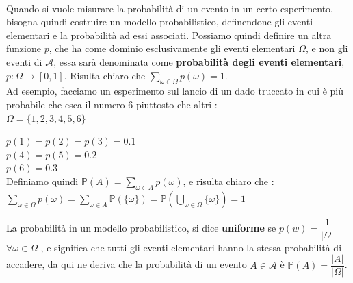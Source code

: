 \documentclass[12pt, letterpaper]{article}
\begin{document}
\\ Quando si vuole misurare la probabilità di un evento in un certo 
esperimento, bisogna quindi costruire un modello probabilistico, definendone gli eventi elementari e
 la probabilità ad essi associati. Possiamo quindi definire un altra funzione \(p\), che ha come dominio
 esclusivamente gli eventi elementari \(\Omega\), e non gli eventi di \(\mathcal{A}\), essa sarà 
 denominata come \textbf{probabilità degli eventi elementari}, \(p:\Omega \rightarrow [0,1]\). Risulta
 chiaro che \(\displaystyle\sum_{\omega \in \Omega} p(\omega)=1  \).\\
 Ad esempio, facciamo un esperimento sul lancio di un dado truccato in cui è più probabile che esca 
 il numero 6 piuttosto che altri :
 \\ \center \(\Omega=\{1,2,3,4,5,6\}\)\\
 \raggedright\( p(1)=p(2)=p(3)=0.1\)\\\( p(4)=p(5)=0.2\)\\\(p(6)=0.3\)
 \\
 Definiamo quindi \(\displaystyle\mathbb{P}(A)=\sum_{\omega \in A}p(\omega)\), e risulta chiaro che :\\
 \centering
 \(\displaystyle\sum_{\omega \in \Omega}p(\omega)=\sum_{\omega \in A}\mathbb{P} (\{\omega\})=
 \mathbb{P}(\bigcup_{\omega \in \Omega}\{\omega\} )=1\)
 \\\raggedright La probabilità in un modello probabilistico, si dice \textbf{uniforme} se \(p(w)=\dfrac{1}{|\Omega|} \) \(\forall \omega \in \Omega\)
, e significa che tutti gli eventi elementari hanno la stessa probabilità di accadere, da qui ne deriva che la 
probabilità di un evento \(A\in \mathcal{A} \) è \(\mathbb{P}(A)=\dfrac{|A|}{|\Omega|}\).
\end{document}
